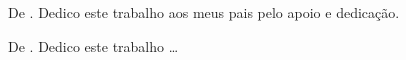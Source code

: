 \begin{dedicatoria}
\vspace*{\fill}
\vspace*{\fill}
\vspace*{\fill}
\vspace*{\fill}
\vspace*{\fill}
\vspace*{\fill}
De \imprimirAutorUm.
\newline
Dedico este trabalho aos meus pais pelo apoio e dedicação.

\vspace*{\fill}
De \imprimirAutorDois.
\newline
Dedico este trabalho \ldots

\end{dedicatoria}

